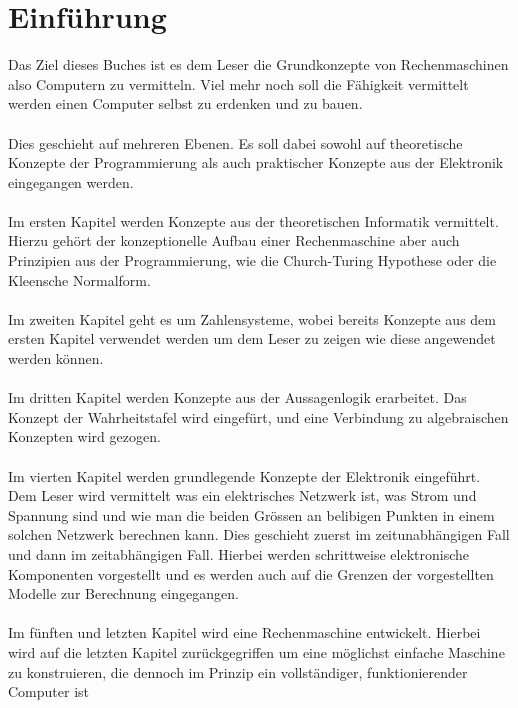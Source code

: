 \documentclass[11pt,a4paper,leqno]{report}
\numberwithin{equation}{chapter}
\begin{document}
\chapter{Einf\"uhrung}
Das Ziel dieses Buches ist es dem Leser die Grundkonzepte von Rechenmaschinen also Computern zu vermitteln. 
Viel mehr noch soll die F\"ahigkeit vermittelt werden einen Computer selbst zu erdenken und zu bauen.\\
\\
Dies geschieht auf mehreren Ebenen. Es soll dabei sowohl auf theoretische Konzepte der Programmierung als auch praktischer Konzepte aus der Elektronik eingegangen werden.\\
\\
Im ersten Kapitel werden Konzepte aus der theoretischen Informatik vermittelt. Hierzu geh\"ort der konzeptionelle Aufbau einer Rechenmaschine aber auch Prinzipien aus der Programmierung, wie die Church-Turing Hypothese oder die Kleensche Normalform.\\
\\
Im zweiten Kapitel geht es um Zahlensysteme, wobei bereits Konzepte aus dem ersten Kapitel verwendet werden um dem Leser zu zeigen wie diese angewendet werden k\"onnen.\\
\\
Im dritten Kapitel werden Konzepte aus der Aussagenlogik erarbeitet. Das Konzept der Wahrheitstafel wird eingef\"urt, und eine Verbindung zu algebraischen Konzepten wird gezogen.\\
\\
Im vierten Kapitel werden grundlegende Konzepte der Elektronik eingef\"uhrt. Dem Leser wird vermittelt was ein elektrisches Netzwerk ist, was Strom und Spannung sind und wie man die beiden Gr\"ossen an belibigen Punkten in einem solchen Netzwerk berechnen kann. Dies geschieht zuerst im zeitunabh\"angigen Fall und dann im zeitabh\"angigen Fall. Hierbei werden schrittweise elektronische Komponenten vorgestellt und es werden auch auf die Grenzen der vorgestellten Modelle zur Berechnung eingegangen.\\
\\
Im f\"unften und letzten Kapitel wird eine Rechenmaschine entwickelt. Hierbei wird auf die letzten Kapitel zur\"uckgegriffen um eine m\"oglichst einfache Maschine zu konstruieren, die dennoch im Prinzip ein vollst\"andiger, funktionierender Computer ist

\end{document}
